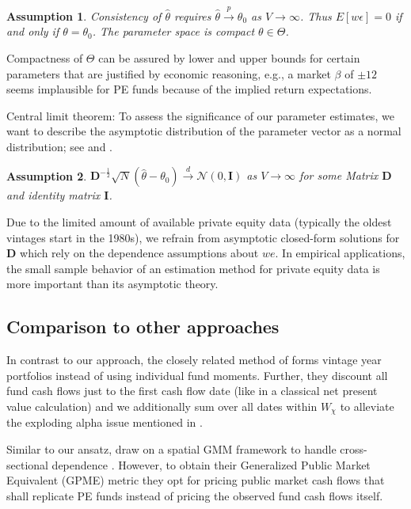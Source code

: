 \documentclass[12pt]{article}
\newtheorem{assume}{Assumption}
\begin{document}
\begin{assume}
 Consistency of $\hat{\theta}$ requires $\hat{\theta} \overset{p}{\to} \theta_0$ as $V \to \infty$.
 Thus $E[w\epsilon]=0$ if and only if $\theta=\theta_0$.
 The parameter space is compact $\theta \in \Theta$.
\end{assume}
Compactness of $\Theta$ can be assured by lower and upper bounds for certain parameters that are justified by economic reasoning, e.g., a market $\beta$ of $\pm 12$ seems implausible for PE funds because of the implied return expectations.

Central limit theorem:
To assess the significance of our parameter estimates, we want to describe the asymptotic distribution of the parameter vector as a normal distribution; see
\cite[Theorem 11.2]{PP97} and \cite[Theorem 4]{JP12}.

\begin{assume}
	$\mathbf{D}^{-\frac{1}{2}} \sqrt{N}(\hat{\theta} - \theta_0) \overset{d}{\to} \mathcal{N}(0,\mathbf{I})$ as $V \to \infty$ for some Matrix $\mathbf{D}$ and identity matrix $\mathbf{I}$.
\end{assume}

Due to the limited amount of available private equity data (typically the oldest vintages start in the 1980s), we refrain from asymptotic closed-form solutions for $\mathbf{D}$ which rely on the dependence assumptions about $we$.
In empirical applications, the small sample behavior of an estimation method for private equity data is more important than its asymptotic theory.


\subsection{Comparison to other approaches}

In contrast to our approach, the closely related method of \cite{DLP12} forms vintage year portfolios instead of using individual fund moments.
Further, they discount all fund cash flows just to the first cash flow date (like in a classical net present value calculation) and we additionally sum over all dates within $W_{\chi}$ to alleviate the exploding alpha issue mentioned in \cite{DLP12}.

Similar to our ansatz, \cite{KN16} draw on a spatial GMM framework to handle cross-sectional dependence \citep{C99}.
However, to obtain their Generalized Public Market Equivalent (GPME) metric they opt for pricing public market cash flows that shall replicate PE funds instead of pricing the observed fund cash flows itself.
\end{document}
